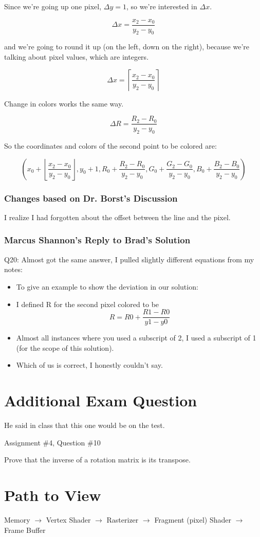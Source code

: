 \documentclass[11pt]{article}
\begin{document}
\begin{spacing}{1.2}
Since we're going up one pixel, $\Delta y = 1$, so we're interested in $\Delta x$.  

$$\Delta x = \frac{x_2 - x_0}{y_2 - y_0}$$

and we're going to round it up (on the left, down on the right), because we're talking about pixel values, which are integers.  

$$\Delta x = \left\lceil\frac{x_2 - x_0}{y_2 - y_0}\right\rceil$$

Change in colors works the same way.  

$$\Delta R = \frac{R_2 - R_0}{y_2 - y_0}$$

So the coordinates and colors of the second point to be colored are:

$$\left( x_0 + \left\lfloor\frac{x_2 - x_0}{y_2 - y_0}\right\rfloor, 
y_0 + 1, 
R_0 + \frac{R_2 - R_0}{y_2 - y_0},
G_0 + \frac{G_2 - G_0}{y_2 - y_0},
B_0 + \frac{B_2 - B_0}{y_2 - y_0}
\right)$$

\subsubsection{Changes based on Dr. Borst's Discussion}

I realize I had forgotten about the offset between the line and the pixel.  

\subsubsection{Marcus Shannon's Reply to Brad's Solution}

Q20: Almost got the same answer, I pulled slightly different equations from my notes:
\begin{itemize}
    \item To give an example to show the deviation in our solution:
      \item I defined R for the second pixel colored to be
          $$R = R0 + \frac{R1 - R0}{y1 - y0}$$
    \item Almost all instances where you used a subscript of 2, I used a subscript of 1 (for the scope of this solution).
    \item Which of us is correct, I honestly couldn't say.
\end{itemize}

\section{Additional Exam Question}

He said in class that this one would be on the test.  

Assignment \#4, Question \#10

Prove that the inverse of a rotation matrix is its transpose.  

\section{Path to View}

Memory $\to$ Vertex Shader $\to$ Rasterizer $\to$ Fragment (pixel) Shader $\to$ Frame Buffer

\end{spacing}
\end{document}
